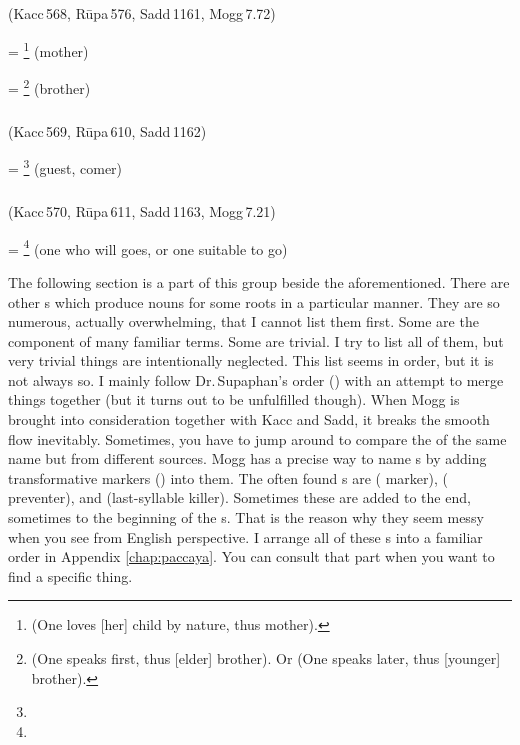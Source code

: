 \subparagraph*{} (Kacc\,568, R\=upa\,576, Sadd\,1161, Mogg\,7.72)\label{pacck11:raatu}\label{pacck11:tu2}

 = \footnote{ (One loves [her] child by nature, thus mother).} (mother)\par
{} = \footnote{ (One speaks first, thus [elder] brother). Or  (One speaks later, thus [younger] brother).} (brother)\par

\subparagraph*{} (Kacc\,569, R\=upa\,610, Sadd\,1162)\label{pacck11:tuka}

 = \footnote{} (guest, comer)\par

\subparagraph*{} (Kacc\,570, R\=upa\,611, Sadd\,1163, Mogg\,7.21)\label{pacck11:ika}\label{pacck11:kika}

 = \footnote{} (one who will goes, or one suitable to go)\par

\bigskip
The following section is a part of this group beside the aforementioned. There are other s which produce nouns for some roots in a particular manner. They are so numerous, actually overwhelming, that I cannot list them first. Some are the component of many familiar terms. Some are trivial. I try to list all of them, but very trivial things are intentionally neglected. This list seems in order, but it is not always so. I mainly follow Dr.\,Supaphan's order (\citealp{supaphan:pali}) with an attempt to merge things together (but it turns out to be unfulfilled though). When Mogg is brought into consideration together with Kacc and Sadd, it breaks the smooth flow inevitably. Sometimes, you have to jump around to compare the  of the same name but from different sources. Mogg has a precise way to name s by adding transformative markers () into them. The often found s are  ( marker),  ( preventer), and  (last-syllable killer). Sometimes these are added to the end, sometimes to the beginning of the s. That is the reason why they seem messy when you see from English perspective. I arrange all of these s into a familiar order in Appendix \ref{chap:paccaya}. You can consult that part when you want to find a specific thing. 

